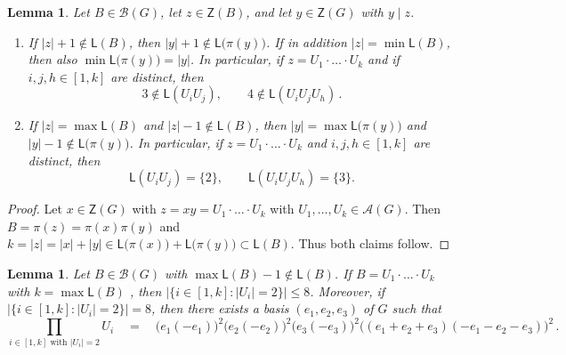 \documentclass[a4paper, 10pt]{amsart}
\theoremstyle{plain}
\newtheorem{lemma}[theorem]{\bf Lemma}
\theoremstyle{definition}
\theoremstyle{definition}
\numberwithin{equation}{section}
\begin{document}
\begin{lemma} \label{lem:hereditary-gap}
Let $B \in \mathcal B (G)$, let $z \in \mathsf Z(B)$, and let $y \in \mathsf Z (G)$ with $y\mid z$. 
\begin{enumerate}
\item If $|z|+1 \notin \mathsf L (B)$, then $|y|+1\notin \mathsf L \big(\pi(y)   \big)$. If in addition $|z| = \min \mathsf L (B)$, then also
     $\min\mathsf L \big(\pi(y) \big)=|y|$.  In particular, if $z=U_1\cdot\ldots\cdot U_k$
     and if $i,j,h \in [1,k]$ are distinct, then
     \[
     3\notin\mathsf L(U_iU_j), \qquad 4\notin\mathsf L(U_iU_jU_h) \,.
     \]
     
\item If $|z| = \max \mathsf L (B)$ and $|z|-1 \notin \mathsf L (B)$,  then
      $|y| = \max \mathsf L \big(\pi (y) \big)$ and $|y|-1 \notin \mathsf L \big(\pi (y) \big)$.
      In particular, if $z = U_1 \cdot \ldots \cdot U_k$ and $i,j,h \in [1,k]$ are distinct, then
      \[
      \mathsf L (U_iU_j)=\{2\}, \qquad \mathsf L (U_iU_jU_h)=\{3\} .
      \]
\end{enumerate}     
\end{lemma}

\begin{proof}
Let $x \in \mathsf Z (G)$ with $z = xy = U_1 \cdot \ldots \cdot U_k$ with $U_1, \ldots, U_k \in \mathcal A (G)$. Then $B = \pi (z) = \pi (x)\pi (y)$ and $k = |z|=|x|+|y| \in \mathsf L \big( \pi (x) \big) + \mathsf L \big( \pi (y) \big) \subset \mathsf L (B)$.
Thus both claims follow.
\end{proof}


\begin{lemma} \label{lem:upper-hole-affine-cap}
Let $B \in \mathcal B (G)$ with 
$\max\mathsf L(B)-1\notin\mathsf L(B)$. If  $B = U_1 \cdot \ldots \cdot U_k$ with $k=\max \mathsf L (B)$ , then $|\{i \in [1,k] \colon |U_i|=2\}| \le 8$. Moreover, if $|\{i \in [1,k] \colon |U_i|=2\}| = 8$, then there exists a basis $(e_1,e_2,e_3)$ of $G$ such that
\[
\prod_{i\in [1,k] \text{ with }|U_i|=2}U_i \quad = \quad \big(e_1(-e_1) \big)^2 \big(e_2(-e_2)\big)^2 \big(e_3(-e_3)\big)^2 \big((e_1+e_2+e_3)(-e_1-e_2-e_3)\big)^2\,.
\] 
\end{lemma}
\end{document}
